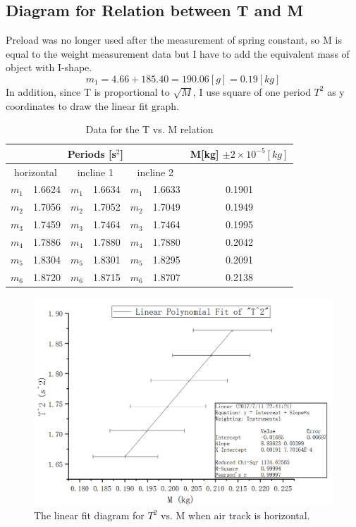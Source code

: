 \documentclass[12pt]{article}
\begin{document}
\subsection{Diagram for Relation between T and M}
Preload was no longer used after the measurement of spring constant, so M is equal to the weight measurement data but I have to add the equivalent mass of object with I-shape. 
$$m_1=4.66+185.40=190.06[g]=0.19[kg]$$
In addition, since T is proportional to $\sqrt{M}$, I use square of one period $T^2$ as y coordinates to draw the linear fit graph.
\begin{table}[H]
\centering
\begin{tabular}{|c|c|c|c|c|c|c|}
\hline
\multicolumn{6}{|c|}{Periods {[}s$^2${]}}    &M[kg] $\pm2\times10^{-5}[kg]$ \\ \hline
\multicolumn{2}{|c|}{horizontal} & \multicolumn{2}{c|}{incline 1} & \multicolumn{2}{c|}{incline 2}& \\ \hline
$m_1$            & 1.6624           &  $m_1$          & 1.6634           &           $m_1$ & 1.6633 &0.1901         \\ \hline
$m_2$             & 1.7056           &  $m_2$              & 1.7052           &           $m_2$     & 1.7049  &0.1949         \\ \hline
$m_3$                 & 1.7459           &    $m_3$         & 1.7464           &           $m_3$  & 1.7464  &0.1995          \\ \hline
$m_4$              & 1.7886           &   $m_4$         & 1.7880           &            $m_4$& 1.7880     &0.2042       \\ \hline
$m_5$             & 1.8304           &   $m_5$         & 1.8301           &           $m_5$ & 1.8295    &0.2091        \\ \hline
$m_6$         & 1.8720           &    $m_6$        & 1.8715           &     $m_6$       & 1.8707 &0.2138           \\ \hline
\end{tabular}
\caption{Data for the T vs. M relation}
\end{table}
\begin{figure}[H]
\centering
\includegraphics[scale=0.4]{P8.jpg}
\caption{The linear fit diagram for $T^2$ vs. M when air track is horizontal.}
\end{figure}
\end{document}
